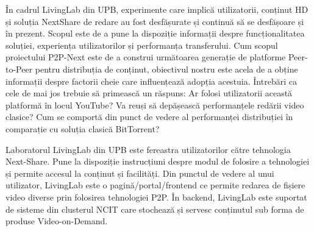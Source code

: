 În cadrul LivingLab din UPB, experimente care implică utilizatorii, conținut
HD și soluția NextShare de redare au fost desfășurate și continuă să se
desfășoare și în prezent. Scopul este de a pune la dispoziție informații despre
funcționalitatea soluției, experiența utilizatorilor și performanța transferului.
Cum scopul proiectului P2P-Next este de a construi următoarea generație de
platforme Peer-to-Peer pentru distribuția de conținut, obiectivul nostru este
acela de a obține informații despre factorii cheie care influențează adopția
acestuia. Întrebări ca cele de mai jos trebuie să primească un răspuns:
Ar folosi utilizatorii această platformă în locul YouTube? Va reuși să
depășească performanțele redării video clasice? Cum se comportă din punct de
vedere al performanței distribuției în comparație cu soluția clasică
BitTorrent?

Laboratorul LivingLab din UPB este fereastra utilizatorilor către tehnologia
Next-Share. Pune la dispoziție instrucțiuni despre modul de folosire a
tehnologiei și permite accesul la conținut și facilități. Din punctul de
vedere al unui utilizator, LivingLab este o pagină/portal/frontend ce permite
redarea de fișiere video diverse prin folosirea tehnologiei P2P. În backend,
LivingLab este suportat de sisteme din clusterul NCIT care stochează și servesc
conținutul sub forma de produse Video-on-Demand.

